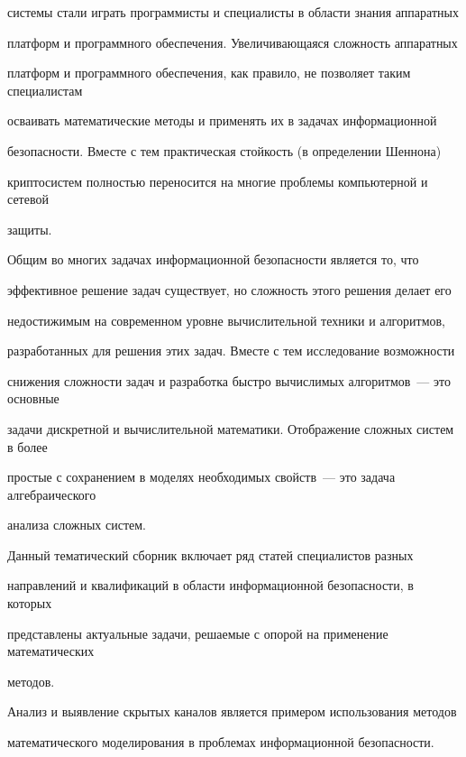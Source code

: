системы стали играть про\-грам\-мис\-ты и специалисты в области знания аппаратных 


платформ и про\-грам\-мно\-го обеспечения. Увеличивающаяся сложность аппаратных 


платформ и про\-грам\-мно\-го обеспечения, как правило, не позволяет таким специалистам 


осваивать математические методы и применять их в задачах информационной 


безопас\-ности. Вместе с тем практическая стойкость (в определении Шеннона) 


крип\-то\-сис\-тем полностью переносится на многие проблемы компьютерной и сетевой 


защиты. 


     


     Общим во многих задачах информационной безопасности является то, что 


эффективное решение задач существует, но сложность этого решения делает его 


недостижимым на современном уровне вычислительной техники и алгоритмов, 


разработанных для решения этих задач. Вместе с тем исследование возможности 


снижения сложности задач и разработка быстро вычислимых алгоритмов~--- это основные 


задачи дискретной и вычислительной математики. Отображение сложных систем в более 


простые с сохранением в моделях необходимых свойств~--- это задача алгебраического 


анализа сложных систем. 


     


     Данный тематический сборник включает ряд статей специалистов разных 


направлений и квалификаций в области информационной безопасности, в которых  


представлены актуальные задачи, решаемые с опорой на применение математических 


методов. 


     


     Анализ и выявление скрытых каналов является примером использования методов 


математического моделирования в проблемах информационной безопасности. 


